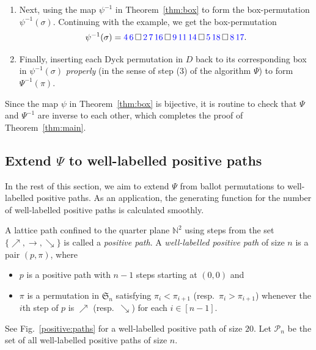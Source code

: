 \documentclass[12pt]{amsart}
\numberwithin{equation}{section}
\def\blue{\textcolor{blue}}
\theoremstyle{plain}
\theoremstyle{definition}
\newcommand{\N}{\mathbb{N}}
\newcommand{\PP}{\mathcal{P}}
\def\S{\mathfrak{S}}
\begin{document}
\begin{enumerate}
\item[(II)] Next, using the map $\psi^{-1}$ in Theorem~\ref{thm:box} to form the  box-permutation $\psi^{-1}(\sigma)$. 
Continuing with the example, we get the box-permutation
$$
\psi^{-1}(\sigma)=\blue{4\,6}\,\Box\,\blue{2\,7\,16}\,\Box\,\blue{9\,11\,14}\,\Box\,\blue{5\,18}\,\Box\blue{\,8\,17}.
$$
 \item[(III)] Finally, inserting each Dyck permutation in $D$ back to its corresponding box in $\psi^{-1}(\sigma)$ {\em properly} (in the sense of step (3) of the algorithm $\Psi$) to form  $\Psi^{-1}(\pi)$.
 \end{enumerate}

Since the map $\psi$ in  Theorem~\ref{thm:box} is bijective, it is routine to check that $\Psi$ and $\Psi^{-1}$ are inverse to each other, which completes the proof of Theorem~\ref{thm:main}.
 

 \subsection{Extend $\Psi$ to well-labelled positive paths}
 In the rest of this section, we aim to extend $\Psi$ from ballot permutations to well-labelled positive paths. As an application, the generating function for the number of  well-labelled positive paths is calculated smoothly. 
 
 A lattice path confined to the quarter plane $\N^2$ using steps from the set $\{\nearrow,\rightarrow,\searrow\}$ is called a {\em positive  path}. A {\em well-labelled positive path} of size $n$ is a pair $(p,\pi)$, where  
 \begin{itemize}
 \item $p$ is a positive path with $n-1$ steps starting at $(0,0)$ and
 \item  $\pi$ is a permutation in $\S_n$ satisfying  $\pi_i<\pi_{i+1}$ (resp.~$\pi_i>\pi_{i+1}$) whenever the $i$th step of $p$ is $\nearrow$ (resp.~$\searrow$) for each $i\in[n-1]$. 
 \end{itemize}
 See Fig.~\ref{positive:paths} for  a well-labelled positive path of size $20$.  Let $\PP_n$ be the set of all well-labelled positive paths of size $n$. 
 
\end{document}

